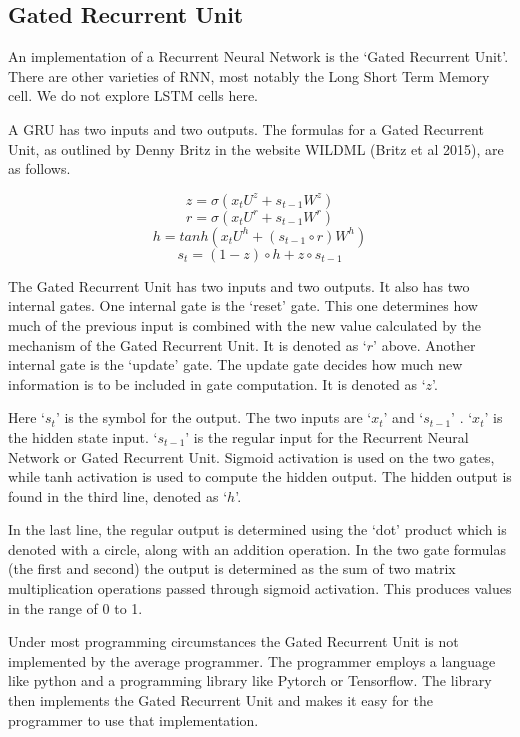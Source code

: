 \subsection*{Gated Recurrent Unit}
An implementation of a Recurrent Neural Network is the `Gated Recurrent Unit'. There are other varieties of RNN, most notably the Long Short Term Memory cell. We do not explore \ac{LSTM} cells here.

A \ac{GRU} has two inputs and two outputs. The formulas for a Gated Recurrent Unit, as outlined by Denny Britz in the website WILDML (Britz et al 2015)\cite{2015Britz}, are as follows.

\begin{minipage}{5in}

$$ z =\sigma(x_tU^z + s_{t-1} W^z) $$  
$$ r =\sigma(x_t U^r +s_{t-1} W^r) $$  
$$ h = tanh(x_t U^h + (s_{t-1} \circ r) W^h) $$  
$$ s_t = (1 - z) \circ h + z \circ s_{t-1} $$  

\end{minipage}

\bigskip \bigskip

The Gated Recurrent Unit has two inputs and two outputs. It also has two internal gates. One internal gate is the `reset' gate. This one determines how much of the previous input is combined with the new value calculated by the mechanism of the Gated Recurrent Unit. It is denoted as `$r$' above. Another internal gate is the `update' gate. The update gate decides how much new information is to be included in gate computation. It is denoted as `$z$'.

Here `$ s_t $' is the symbol for the output. The two inputs are `$ x_t $' and `$ s_{t-1} $' . `$ x_t $' is the hidden state input. `$ s_{t-1} $' is the regular input for the Recurrent Neural Network or Gated Recurrent Unit. Sigmoid activation is used on the two gates, while tanh activation is used to compute the hidden output. The hidden output is found in the third line, denoted as `$h$'.

In the last line, the regular output is determined using the `dot' product which is denoted with a circle, along with an addition operation. In the two gate formulas (the first and second) the output is determined as the sum of two matrix multiplication operations passed through sigmoid activation. This produces values in the range of 0 to 1.

Under most programming circumstances the Gated Recurrent Unit is not implemented by the average programmer. The programmer employs a language like python and a programming library like Pytorch or Tensorflow. The library then implements the Gated Recurrent Unit and makes it easy for the programmer to use that implementation.

